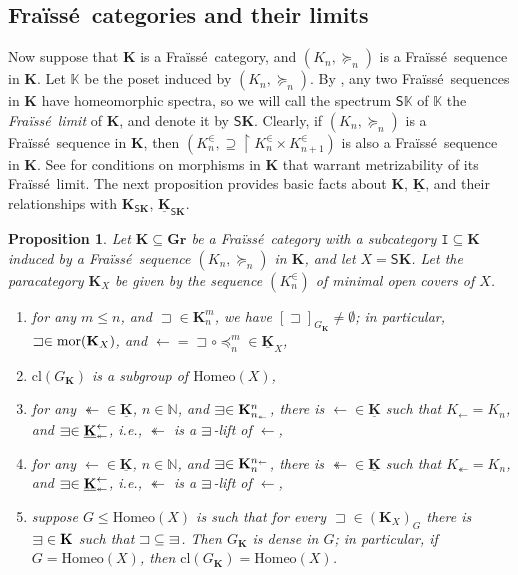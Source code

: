 \documentclass[12pt]{amsart}
\numberwithin{equation}{section}
\theoremstyle{plain}
\newtheorem{proposition}[theorem]{\bf Proposition}
\theoremstyle{definition}
\newcommand{\sqni}{\mathrel{\vphantom{\sqsupset}\text{\mathsurround=0pt\ooalign{$\sqsupset$\cr$-$\cr}}}}
\newcommand \Homeo{ \mbox{Homeo}}
\newcommand \Sp{{\mathsf{S}}}
\newcommand \sqsp{\sqsupset}
\newcommand \la{\leftarrow}
\newcommand \tla{\twoheadleftarrow}
\newcommand{\cl}{\mbox{cl}}
\newcommand \mor{{\rm{mor}}}
\newcommand \fra{Fra\"{i}ss\'{e}}
\newcommand \uhr{\upharpoonright}
\newcommand \GGRb{\mathbf{Gr}}
\newcommand \KKb{\mathbf{K}}
\newcommand \KKub{\underline{\mathbf{K}}}
\newcommand \KK{\mathbb{K}}
\newcommand \NN{\mathbb{N}}
\newcommand \It{\mathtt{I}}
\begin{document}
\subsection{\fra \ categories and their limits} Now suppose that $\KKb$ is a \fra \ category, and $(K_n, \succeq_n)$ is a \fra \ sequence in $\KKb$. Let $\KK$ be the poset induced by $(K_n, \succeq_n)$.  %
By \cite[Proposition 4.32]{BaBiVi2}, any two \fra \ sequences in $\KKb$ have homeomorphic spectra, so we will call the spectrum $\Sp \KK$ of $\KK$ the \emph{\fra \ limit} of $\KKb$, and denote it by $\Sp \KKb$. Clearly, if $(K_n, \succeq_n)$ is a \fra \ sequence in $\KKb$, then $(K^\in_n,\supseteq \uhr K^\in_{n} \times K^\in_{n+1})$ is  also a \fra \ sequence in $\KKb$. See \cite[Theorem 4.34]{BaBiVi2} for conditions on morphisms in $\KKb$ that warrant metrizability of its \fra \ limit. The next proposition provides basic facts about $\KKb$, $\KKub$, and their relationships with $\KKb_{\Sp \KKb}$, $\KKub_{\Sp \KKb}$.


\begin{proposition}
\label{pr:Robust}
Let $\KKb \subseteq \GGRb$ be a \fra \ category with a subcategory $\It \subseteq \KKb$ induced by a \fra \ sequence $(K_n, \succeq_n)$ in $\KKb$, and let $X=\Sp \KKb$. Let the paracategory $\KKb_{X}$ be given by the sequence $(K^\in_n)$ of minimal open covers of $X$. %
%
\begin{enumerate}
	\item for any $m \leq n$, and $\sqsp \in \KKb^m_n$, we have $[\sqsp]_{G_\KKb} \neq \emptyset$; in particular, $\sqsp \in \mor(\KKb_X)$, and $\la=\sqsp \circ \preceq_n^m \in  \KKub_X$,
	\item $\cl(G_\KKb)$ is a subgroup of $\Homeo(X)$, 
	\item for any $\tla \in \KKub$, $n \in \NN$, and $\sqni \in \KKb^n_{n_\tla}$,  there is $\la \in \KKub$ such that $K_\la=K_n$, and $\sqni \in \KKub^\la_{\tla}$, i.e., $\tla$ is a $\sqni$-lift of $\la$,
	\item for any $\la \in \KKub$, $n \in \NN$, and $\sqni \in \KKb^{n_\la}_n$, there is $\tla \in \KKub$ such that $K_\tla=K_n$, and $\sqni \in \KKub^\la_{\tla}$, i.e., $\tla$ is a $\sqni$-lift of $\la$,
	\item suppose $G \leq \Homeo(X)$ is such that  for every ${\sqsp} \in (\KKb_X)_G$ there is ${\sqni} \in \KKb$ such that ${\sqsp} \subseteq {\sqni}$. Then $G_\KKb$ is dense in $G$; in particular, if $G=\Homeo(X)$, then $\cl(G_\KKb)=\Homeo(X)$.
\end{enumerate}	
\end{proposition}
\end{document}

